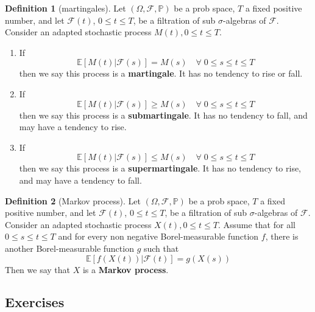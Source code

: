 \documentclass[11pt]{article}
\theoremstyle{definition}
\theoremstyle{definition}
\theoremstyle{definition}
\newtheorem{definition}{\textcolor{OliveGreen}{Definition}}
\theoremstyle{remark}
\begin{document}
\begin{definition}[martingales]
    Let $(\Omega, \mathcal{F}, \mathbb{P})$ be a prob space, $T$ a fixed positive number, and let $\mathcal{F}(t)$, $0 \leq t \leq T$,
    be a filtration of sub $\sigma$-algebras of $\mathcal{F}$. Consider an adapted stochastic process $M(t), 0 \leq t \leq T$.
    \begin{enumerate}
        \item If
        \[
            \mathbb{E}[M(t) | \mathcal{F}(s)] = M(s) \quad \forall \; 0 \leq s \leq t \leq T
        \] 
        then we say this process is a \textbf{martingale}. It has no tendency to rise or fall.
        \item If
        \[
            \mathbb{E}[M(t) | \mathcal{F}(s)] \geq M(s) \quad \forall \; 0 \leq s \leq t \leq T
        \] 
        then we say this process is a \textbf{submartingale}. It has no tendency to fall, and may have a tendency to rise.
        \item If
        \[
            \mathbb{E}[M(t) | \mathcal{F}(s)] \leq M(s) \quad \forall \; 0 \leq s \leq t \leq T
        \] 
        then we say this process is a \textbf{supermartingale}. It has no tendency to rise, and may have a tendency to fall.
    \end{enumerate}        
\end{definition}

\begin{definition}[Markov process]
    Let $(\Omega, \mathcal{F}, \mathbb{P})$ be a prob space, $T$ a fixed positive number, and let $\mathcal{F}(t)$, $0 \leq t \leq T$,
    be a filtration of sub $\sigma$-algebras of $\mathcal{F}$. Consider an adapted stochastic process $X(t), 0 \leq t \leq T$.
    Assume that for all $0 \leq s \leq t \leq T$ and for every non negative Borel-measurable function $f$, there is another
    Borel-measurable function $g$ such that
    \[
        \mathbb{E}[f(X(t)) | \mathcal{F}(t)] = g(X(s))
    \]      
    Then we say that $X$ is a \textbf{Markov process}. 
\end{definition}




\subsection{Exercises}
\end{document}
